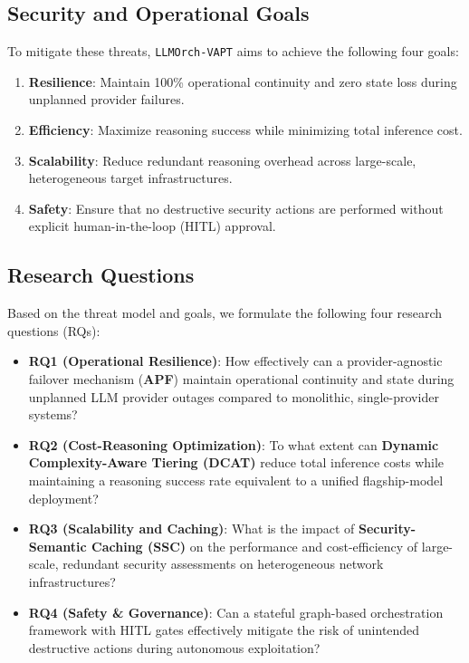 \subsection{Security and Operational Goals}
To mitigate these threats, \texttt{LLMOrch-VAPT} aims to achieve the following four goals:
\begin{enumerate}
    \item \textbf{Resilience}: Maintain 100\% operational continuity and zero state loss during unplanned provider failures.
    \item \textbf{Efficiency}: Maximize reasoning success while minimizing total inference cost.
    \item \textbf{Scalability}: Reduce redundant reasoning overhead across large-scale, heterogeneous target infrastructures.
    \item \textbf{Safety}: Ensure that no destructive security actions are performed without explicit human-in-the-loop (HITL) approval.
\end{enumerate}

\subsection{Research Questions}
Based on the threat model and goals, we formulate the following four research questions (RQs):
\begin{itemize}
    \item \textbf{RQ1 (Operational Resilience)}: How effectively can a provider-agnostic failover mechanism (\textbf{APF}) maintain operational continuity and state during unplanned LLM provider outages compared to monolithic, single-provider systems?
    \item \textbf{RQ2 (Cost-Reasoning Optimization)}: To what extent can \textbf{Dynamic Complexity-Aware Tiering (DCAT)} reduce total inference costs while maintaining a reasoning success rate equivalent to a unified flagship-model deployment?
    \item \textbf{RQ3 (Scalability and Caching)}: What is the impact of \textbf{Security-Semantic Caching (SSC)} on the performance and cost-efficiency of large-scale, redundant security assessments on heterogeneous network infrastructures?
    \item \textbf{RQ4 (Safety \& Governance)}: Can a stateful graph-based orchestration framework with HITL gates effectively mitigate the risk of unintended destructive actions during autonomous exploitation?
\end{itemize}
